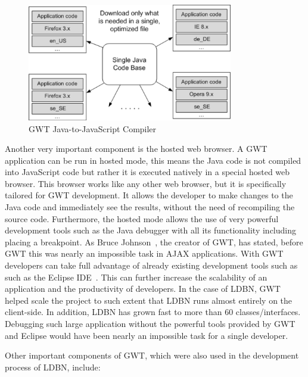 \begin{figure}[h]
	\begin{center}
		\includegraphics[width=0.8\textwidth]{./img/gwt01a.png}
		\caption{GWT Java-to-JavaScript Compiler}
		\label{fig:gwt01}
	\end{center}
\end{figure}

Another very important component is the hosted web browser. A GWT application can 
be run in hosted mode, this means 
the Java code is not compiled into JavaScript code but rather it is executed natively  
in a special hosted web browser. This browser works like any other web
browser, but it is specifically tailored for GWT development. It allows the developer
to make changes to the Java code and immediately see the results, without the need
of recompiling the source code. Furthermore, the hosted mode allows the use of 
very powerful development tools such as the Java debugger with all its functionality 
including placing a breakpoint. As Bruce Johnson~\cite{wgdd1}, 
the creator of GWT, has stated, before GWT this was nearly an impossible task in 
AJAX applications. With GWT developers can take full advantage of 
already existing development tools such as such as the Eclipse IDE~\cite{weclipse}. 
This can further increase the scalability of an application and the productivity 
of developers. 
In the case of LDBN, GWT helped scale the project to such extent that LDBN runs 
almost entirely on the client-side. In addition, LDBN has grown fast to 
more than 60 classes/interfaces. Debugging such large application without the powerful 
tools provided by GWT and Eclipse would have been nearly an impossible task for 
a single developer.

Other important components of GWT, which were also used in the development 
process of LDBN, include:


